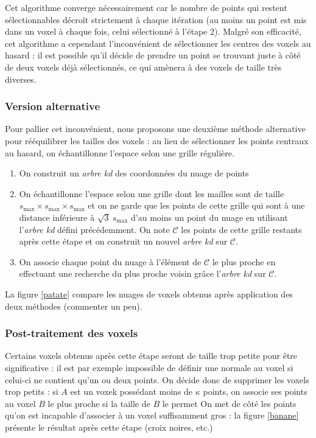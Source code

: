 \documentclass[a4paper, onecolumn, 11pt]{article}
\begin{document}
Cet algorithme converge nécessairement car le nombre de points qui restent sélectionnables décroît strictement à chaque itération (au moins un point est mis dans un voxel à chaque fois, celui sélectionné à l'étape 2). Malgré son efficacité, cet algorithme a cependant l'inconvénient de sélectionner les centres des voxels au hasard : il est possible qu'il décide de prendre un point se trouvant juste à côté de deux voxels déjà sélectionnés, ce qui amènera à des voxels de taille très diverses. 

\subsubsection*{Version alternative}
Pour pallier cet inconvénient, nous proposons une deuxième méthode alternative pour rééquilibrer les tailles des voxels : au lieu de sélectionner les points centraux au hasard, on échantillonne l'espace selon une grille régulière.

\begin{enumerate}
\item On construit un \emph{arbre kd} des coordonnées du nuage de points
\item On échantillonne l'espace selon une grille dont les mailles sont de taille $s_\text{max} \times s_\text{max}\times s_\text{max}$ et on ne garde que les points de cette grille qui sont à une distance inférieure à $\sqrt{3}\ s_\text{max}$ d'au moins un point du nuage en utilisant l'\emph{arbre kd} défini précédemment. On note $\mathcal{C}$ les points de cette grille restants après cette étape et on construit un nouvel \emph{arbre kd} sur $\mathcal{C}$.
\item On associe chaque point du nuage à l'élément de $\mathcal{C}$ le plus proche en effectuant une recherche du plus proche voisin grâce l'\emph{arbre kd} sur $\mathcal{C}$.
\end{enumerate}

La figure \ref{patate} compare les nuages de voxels obtenus après application des deux méthodes (commenter un peu).

\subsubsection*{Post-traitement des voxels}
Certains voxels obtenus après cette étape seront de taille trop petite pour être significative : il est par exemple impossible de définir une normale au voxel si celui-ci ne contient qu'un ou deux points. On décide donc de supprimer les voxels trop petits : si $A$ est un voxek possédant moins de $\kappa$ points, on associe ses points au voxel $B$ le plus proche si la taille de $B$ le permet %
On met de côté les points qu'on est incapable d'associer à un voxel suffisamment gros : la figure \ref{banane} présente le résultat après cette étape (croix noires, etc.)
\end{document}
